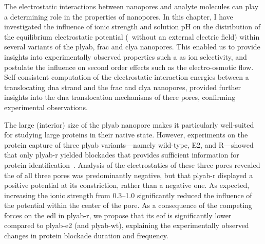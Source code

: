 The electrostatic interactions between nanopores and analyte molecules can play a determining role in the
properties of nanopores. In this chapter, I have investigated the influence of ionic strength and solution pH
on the distribution of the equilibrium electrostatic potential (\ie~without an external electric field) within
several variants of the \gls{plyab}, \gls{frac} and \gls{clya} nanopores. This enabled us to provide insights
into experimentally observed properties such a as ion selectivity, and postulate the influence on second order
effects such as the electro-osmotic flow. Self-consistent computation of the electrostatic interaction
energies between a translocating \gls{dna} strand and the \gls{frac} and \gls{clya} nanopores, provided
further insights into the \gls{dna} translocation mechanisms of there pores, confirming experimental
observations.

The large (interior) size of the \gls{plyab} nanopore makes it particularly well-suited for studying large
proteins in their native state. However, experiments on the protein capture of three \gls{plyab}
variants---namely wild-type, E2, and R---showed that only \gls{plyab-r} yielded blockades that provides
sufficient information for protein identification~\cite{Huang-2020}. Analysis of the electrostatics of these
three pores revealed the \lumen{} of all three pores was predominantly negative, but that \gls{plyab-r}
displayed a positive potential at its constriction, rather than a negative one. As expected, increasing the
ionic strength from \SIrange{0.3}{1.0}{\Molar} significantly reduced the influence of the potential within the
center of the pore. As a consequence of the competing forces on the \gls{edl} in \gls{plyab-r}, we propose
that its \gls{eof} is significantly lower compared to \gls{plyab-e2} (and \gls{plyab-wt}), explaining the
experimentally observed changes in protein blockade duration and frequency.

